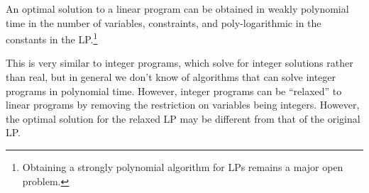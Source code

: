   \begin{theorem}[Optimality of LP]
    An optimal solution to a linear program can be obtained in weakly polynomial time in the number of variables, constraints, and poly-logarithmic in the constants in the LP.\footnote{Obtaining a strongly polynomial algorithm for LPs remains a major open problem.} 
  \end{theorem} 

  This is very similar to integer programs, which solve for integer solutions rather than real, but in general we don't know of algorithms that can solve integer programs in polynomial time. However, integer programs can be ``relaxed'' to linear programs by removing the restriction on variables being integers. However, the optimal solution for the relaxed LP may be different from that of the original LP. 

  \begin{example}
    
  \end{example}

  \begin{example}
    
  \end{example} 

